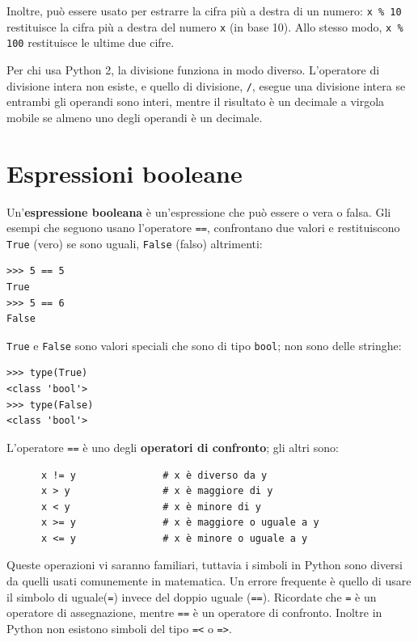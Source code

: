 \documentclass[10pt]{book}
\begin{document}
Inoltre, può essere usato per estrarre la cifra più a destra di un numero: {\tt x \% 10} restituisce la cifra più a destra del numero {\tt x} (in base 10). Allo stesso modo, {\tt x \% 100} restituisce le ultime due cifre.

Per chi usa Python 2, la divisione funziona in modo diverso. L'operatore di divisione intera non esiste, e quello di divisione, \verb"/", esegue una divisione intera se entrambi gli operandi sono interi, mentre il risultato è un decimale a virgola mobile se almeno uno degli operandi è un decimale.


\section{Espressioni booleane}

Un'{\bf espressione booleana} è un'espressione che può essere o vera o falsa.  Gli esempi che seguono usano l'operatore {\tt ==}, confrontano due valori e restituiscono {\tt True} (vero) se sono uguali, {\tt False} (falso) altrimenti:

\begin{verbatim}
>>> 5 == 5
True
>>> 5 == 6
False
\end{verbatim}
%
{\tt True} e {\tt False} sono valori speciali che sono di tipo {\tt bool}; non sono delle stringhe:

\begin{verbatim}
>>> type(True)
<class 'bool'>
>>> type(False)
<class 'bool'>
\end{verbatim}
%
L'operatore {\tt ==} è uno degli {\bf operatori di confronto}; gli altri sono:

\begin{verbatim}
      x != y               # x è diverso da y
      x > y                # x è maggiore di y
      x < y                # x è minore di y
      x >= y               # x è maggiore o uguale a y
      x <= y               # x è minore o uguale a y
\end{verbatim}
%
Queste operazioni vi saranno familiari, tuttavia i simboli in Python sono diversi da quelli usati comunemente in matematica. Un errore frequente è quello di usare il simbolo di uguale({\tt =}) invece del doppio uguale
({\tt ==}). Ricordate che {\tt =} è un operatore di assegnazione, mentre
{\tt ==} è un operatore di confronto. Inoltre in Python non esistono simboli del
tipo {\tt =<} o {\tt =>}.
\end{document}
